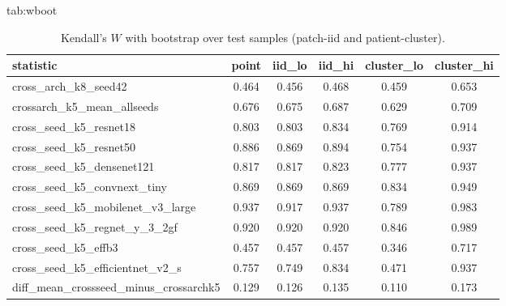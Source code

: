 \begin{table}[t]
\floatconts
  {tab:wboot}
  {\caption{Kendall's $W$ with bootstrap over test samples (patch-iid and patient-cluster).}}
  {\small
  \begin{tabular}{@{}lccccc@{}}
  \toprule
  statistic & point & iid\_lo & iid\_hi & cluster\_lo & cluster\_hi \\
  \midrule
  cross\_arch\_k8\_seed42 & 0.464 & 0.456 & 0.468 & 0.459 & 0.653 \\
  crossarch\_k5\_mean\_allseeds & 0.676 & 0.675 & 0.687 & 0.629 & 0.709 \\
  cross\_seed\_k5\_resnet18 & 0.803 & 0.803 & 0.834 & 0.769 & 0.914 \\
  cross\_seed\_k5\_resnet50 & 0.886 & 0.869 & 0.894 & 0.754 & 0.937 \\
  cross\_seed\_k5\_densenet121 & 0.817 & 0.817 & 0.823 & 0.777 & 0.937 \\
  cross\_seed\_k5\_convnext\_tiny & 0.869 & 0.869 & 0.869 & 0.834 & 0.949 \\
  cross\_seed\_k5\_mobilenet\_v3\_large & 0.937 & 0.917 & 0.937 & 0.789 & 0.983 \\
  cross\_seed\_k5\_regnet\_y\_3\_2gf & 0.920 & 0.920 & 0.920 & 0.846 & 0.989 \\
  cross\_seed\_k5\_effb3 & 0.457 & 0.457 & 0.457 & 0.346 & 0.717 \\
  cross\_seed\_k5\_efficientnet\_v2\_s & 0.757 & 0.749 & 0.834 & 0.471 & 0.937 \\
  diff\_mean\_crossseed\_minus\_crossarchk5 & 0.129 & 0.126 & 0.135 & 0.110 & 0.173 \\
  \bottomrule
  \end{tabular}}
\end{table}
